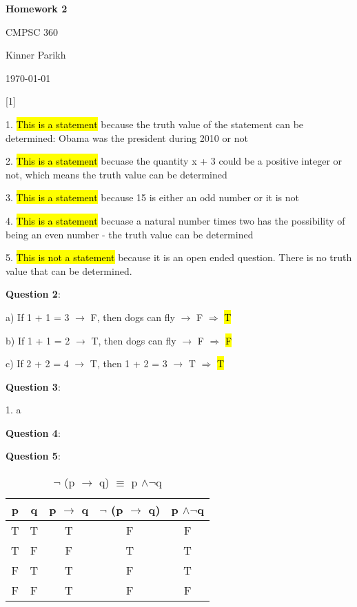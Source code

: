 \documentclass{article} %
\newcommand{\question}[2][]{\begin{flushleft}
        \textbf{Question #1}: \textit{#2}

\end{flushleft}}
\newcommand{\maketitletwo}[2][]{\begin{center}
        \Large{\textbf{Homework #1}
            
            CMPSC 360} %
        \vspace{5pt}
        
        \normalsize{Kinner Parikh  %
        
        \today}        %
        \vspace{15pt}
        
\end{center}}
\begin{document}
    \maketitletwo[2]  %
    
    \question[1]{}
    
        1. \hl{This is a statement} because the truth value of the statement can be determined: Obama was \tabto{1cm} the president during 2010 or not

        2. \hl{This is a statement} becuase the quantity x + 3 could be a positive integer or not, which \tabto{1cm} means the truth value can be determined

        3. \hl{This is a statement} because 15 is either an odd number or it is not

        4. \hl{This is a statement} becuase a natural number times two has the possibility of being an even \tabto{1cm} number - the truth value can be determined

        5. \hl{This is not a statement} because it is an open ended question. There is no truth value that \tabto{1cm} can be determined.

    \question[2]{}

        a) If 1 + 1 = 3 $\rightarrow$ F, then dogs can fly $\rightarrow$ F $\Rightarrow$  \hl{T}

        b) If 1 + 1 = 2 $\rightarrow$ T, then dogs can fly $\rightarrow$ F $\Rightarrow$  \hl{F}

        c) If 2 + 2 = 4 $\rightarrow$ T, then 1 + 2 = 3 $\rightarrow$ T $\Rightarrow$  \hl{T}

    \question[3]{}

    1. a 
    
    \question[4]{}

    \question[5]{}

    \begin{table}[h!]
        \centering
        \caption{$\neg$ (p $\rightarrow$ q) $\equiv$ p $\land \neg$q}
        \begin{tabular}{c | c | c | c | c}
            p & q & p $\rightarrow$ q & $\neg$ (p $\rightarrow$ q) & p $\land \neg$q \\
            \hline
            T & T & T & F & F \\
            T & F & F & T & T \\
            F & T & T & F & T \\
            F & F & T & F & F
        \end{tabular}
    \end{table}
\end{document}
